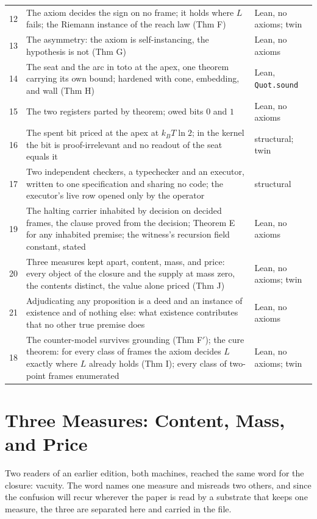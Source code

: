 \documentclass[10pt,twocolumn]{article}
\begin{document}
\begin{table}[t]
\begin{tabular}{@{}p{}p{}p{}@{}}
12 & The axiom decides the sign on no frame; it holds where $L$ fails; the Riemann instance of the reach law (Thm F) & Lean, no axioms; twin \\
13 & The asymmetry: the axiom is self-instancing, the hypothesis is not (Thm G) & Lean, no axioms \\
14 & The seat and the arc in toto at the apex, one theorem carrying its own bound; hardened with cone, embedding, and wall (Thm H) & Lean, \texttt{Quot.sound} \\
15 & The two registers parted by theorem; owed bits $0$ and $1$ & Lean, no axioms \\
16 & The spent bit priced at the apex at $k_B T \ln 2$; in the kernel the bit is proof-irrelevant and no readout of the seat equals it & structural; twin \\
17 & Two independent checkers, a typechecker and an executor, written to one specification and sharing no code; the executor's live row opened only by the operator & structural \\
19 & The halting carrier inhabited by decision on decided frames, the clause proved from the decision; Theorem E for any inhabited premise; the witness's recursion field constant, stated & Lean, no axioms \\
20 & Three measures kept apart, content, mass, and price: every object of the closure and the supply at mass zero, the contents distinct, the value alone priced (Thm J) & Lean, no axioms; twin \\
21 & Adjudicating any proposition is a deed and an instance of existence and of nothing else: what existence contributes that no other true premise does & Lean, no axioms \\
18 & The counter-model survives grounding (Thm F$'$); the cure theorem: for every class of frames the axiom decides $L$ exactly where $L$ already holds (Thm I); every class of two-point frames enumerated & Lean, no axioms; twin \\
\bottomrule
\end{tabular}
\end{table}

\hypertarget{three-measures-content-mass-and-price}{%
\section{Three Measures: Content, Mass, and
Price}\label{three-measures-content-mass-and-price}}

Two readers of an earlier edition, both machines, reached the same word
for the closure: vacuity. The word names one measure and misreads two
others, and since the confusion will recur wherever the paper is read by
a substrate that keeps one measure, the three are separated here and
carried in the file.
\end{document}
